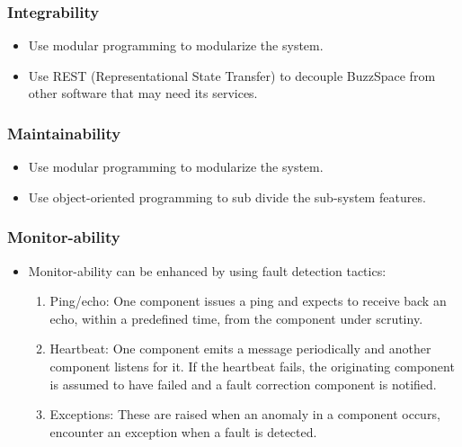 \subsubsection{Integrability}
	\begin{itemize}
		\item Use modular programming to modularize the system. 
		\item Use REST (Representational State Transfer) to decouple BuzzSpace from other software that may need its services.
	\end{itemize}
\subsubsection{Maintainability}
	\begin{itemize}
		\item Use modular programming to modularize the system.
		\item Use object-oriented programming to sub divide the sub-system features.
	\end{itemize}
\subsubsection{Monitor-ability}
	\begin{itemize}
		\item Monitor-ability can be enhanced by using fault detection tactics:
		\begin{enumerate}
			\item Ping/echo: One component issues a ping and expects to receive back an echo, within a predefined time, from the component under scrutiny.
			\item Heartbeat: One component emits a message periodically and another component listens for it. If the heartbeat fails, the originating component is assumed to have failed and a fault correction component is notified.
			\item Exceptions: These are raised when an anomaly in a component occurs, encounter an exception when a fault is detected.
		\end{enumerate}
	\end{itemize}
